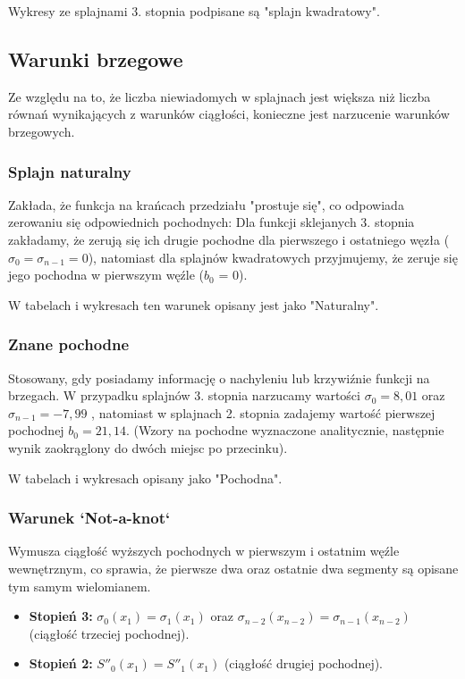 \documentclass{article}
\begin{document}
Wykresy ze splajnami 3. stopnia podpisane są "splajn kwadratowy".

\subsection{Warunki brzegowe}

Ze względu na to, że liczba niewiadomych w splajnach jest większa niż liczba równań wynikających z warunków ciągłości, konieczne jest narzucenie warunków brzegowych.

\subsubsection{Splajn naturalny}
Zakłada, że funkcja na krańcach przedziału "prostuje się", co odpowiada zerowaniu się odpowiednich pochodnych:
Dla funkcji sklejanych 3. stopnia zakładamy, że zerują się ich drugie pochodne dla pierwszego i ostatniego węzła ($\sigma_0 = \sigma_{n-1} = 0$), natomiast dla splajnów kwadratowych
przyjmujemy, że zeruje się jego pochodna w pierwszym węźle ($b_0$ = 0).


W tabelach i wykresach ten warunek opisany jest jako "Naturalny".

\subsubsection{Znane pochodne}
Stosowany, gdy posiadamy informację o nachyleniu lub krzywiźnie funkcji na brzegach. W przypadku splajnów 3. stopnia narzucamy wartości $\sigma_0 = 8,01$ oraz
$\sigma_{n-1} = -7,99$ , natomiast w splajnach 2. stopnia zadajemy wartość pierwszej pochodnej $b_0 = 21,14 $. (Wzory na pochodne wyznaczone analitycznie, następnie
wynik zaokrąglony do dwóch miejsc po przecinku).

W tabelach i wykresach opisany jako "Pochodna".

\subsubsection{Warunek `Not-a-knot`}
Wymusza ciągłość wyższych pochodnych w pierwszym i ostatnim węźle wewnętrznym, co sprawia, że pierwsze dwa oraz ostatnie dwa segmenty są opisane tym samym wielomianem.
\begin{itemize}
    \item \textbf{Stopień 3:} $\sigma_0(x_1) = \sigma_1(x_1)$ oraz $\sigma_{n-2}(x_{n-2}) = \sigma_{n-1}{(x_{n-2})}$ (ciągłość trzeciej pochodnej).
    \item \textbf{Stopień 2:} $S''_0(x_1) = S''_1(x_1)$ (ciągłość drugiej pochodnej).
\end{itemize}
\end{document}
